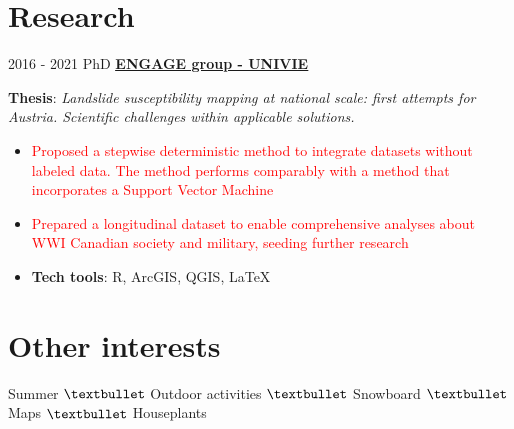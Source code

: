 \documentclass[letterpaper]{twentysecondcv} %
\begin{document}
\section{Research}
\begin{twenty}
	\twentyitem
    	{2016 - 2021}
		{}
        {PhD}
        {\href{https://geographie.univie.ac.at/arbeitsgruppen/engage-geomorphologische-systeme-und-risikoforschung/}{\normalsize  \textbf{\underline{\textcolor{mainblue}{ENGAGE group - UNIVIE}}}}}
        {}
        {
       	\textbf{Thesis}: \textit{Landslide susceptibility mapping at national scale: first attempts for Austria. Scientific challenges within applicable solutions.}
        {\begin{itemize}
        \item \textcolor{red}{Proposed a stepwise deterministic method to integrate datasets without labeled data. The method performs comparably with a method that incorporates a Support Vector Machine}
        \item \textcolor{red}{Prepared a longitudinal dataset to enable comprehensive analyses about WWI Canadian society and military, seeding further research}
        \item \textbf{Tech tools}: R, ArcGIS, QGIS, \large \LaTeX
		\end{itemize}}
        }
\end{twenty}

\section{Other interests}
\begin{center} Summer $\textbullet$ Outdoor activities $\textbullet$ Snowboard $\textbullet$ Maps $\textbullet$ Houseplants  \\ 
\vspace{2mm}
\faCoffee \hspace*{0.5cm} \faBeer \hspace*{0.5cm}\faSpotify \hspace*{0.5cm}\faSunO \hspace*{0.5cm}\faBicycle \hspace*{0.5cm}\faGraduationCap  \hspace*{0.5cm} \faMapMarker \hspace*{0.5cm}\faMap \hspace*{0.5cm}\faPlane \hspace*{0.5cm}\faRoad \hspace*{0.5cm}\faSignal \hspace*{0.5cm} \faLineChart  \hspace*{0.5cm}\faUniversity 
\end{center}

\end{document}
